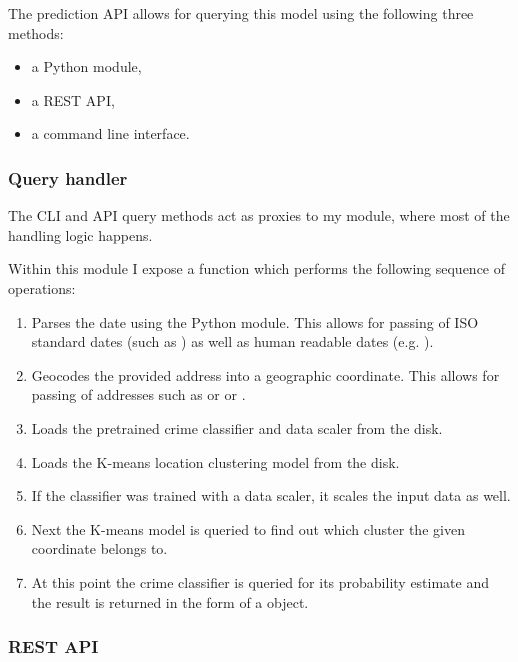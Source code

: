 \documentclass{article}
\begin{document}
	The prediction API allows for querying this model using the following three methods:

	\begin{itemize}
		\item a Python module,
		\item a REST API,
		\item a command line interface.
	\end{itemize}

	\subsubsection{Query handler}

	The CLI and API query methods act as proxies to my  module, where most of the handling logic happens.

	Within this module I expose a  function which performs the following sequence of operations:

	\begin{enumerate}
		\item Parses the date using the  Python module. This allows for passing of ISO standard dates (such as ) as well as human readable dates (e.g. ).
		\item Geocodes the provided address into a geographic coordinate. This allows for passing of addresses such as  or  or .
		\item Loads the pretrained crime classifier and data scaler from the disk.
		\item Loads the K-means location clustering model from the disk.
		\item If the classifier was trained with a data scaler, it scales the input data as well.
		\item Next the K-means model is queried to find out which cluster the given coordinate belongs to.
		\item At this point the crime classifier is queried for its probability estimate and the result is returned in the form of a  object.
	\end{enumerate}

	\subsubsection{REST API}
\end{document}

